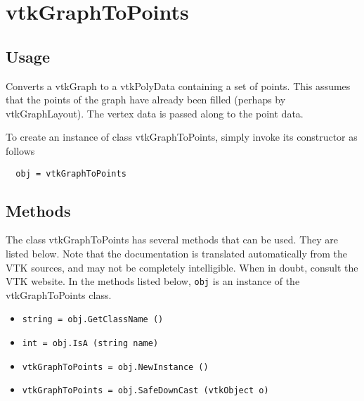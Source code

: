 \section{vtkGraphToPoints}

\subsection{Usage}

 Converts a vtkGraph to a vtkPolyData containing a set of points.
 This assumes that the points
 of the graph have already been filled (perhaps by vtkGraphLayout).
 The vertex data is passed along to the point data.

To create an instance of class vtkGraphToPoints, simply
invoke its constructor as follows
\begin{verbatim}
  obj = vtkGraphToPoints
\end{verbatim}
\subsection{Methods}

The class vtkGraphToPoints has several methods that can be used.
  They are listed below.
Note that the documentation is translated automatically from the VTK sources,
and may not be completely intelligible.  When in doubt, consult the VTK website.
In the methods listed below, \verb|obj| is an instance of the vtkGraphToPoints class.
\begin{itemize}
\item  \verb|string = obj.GetClassName ()|

\item  \verb|int = obj.IsA (string name)|

\item  \verb|vtkGraphToPoints = obj.NewInstance ()|

\item  \verb|vtkGraphToPoints = obj.SafeDownCast (vtkObject o)|

\end{itemize}
